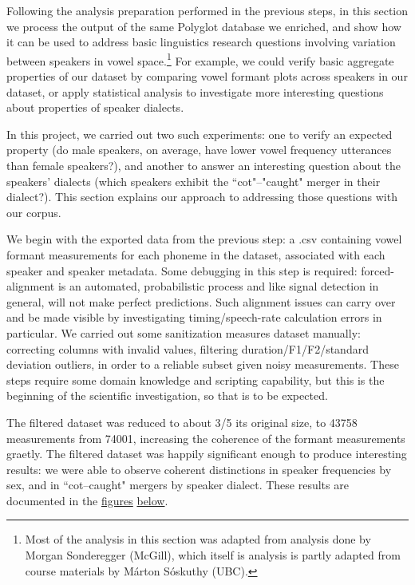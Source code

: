 \documentclass[11pt]{article}
\begin{document}
Following the analysis preparation performed in the previous steps, in this section we process the output of the same Polyglot database we enriched, and show how it can be used to address basic linguistics research questions involving variation between speakers in vowel space.\footnote{Most of the analysis in this section was adapted from analysis done by Morgan Sonderegger (McGill), which itself is analysis is partly adapted from course materials by Márton Sóskuthy (UBC).} For example, we could verify basic aggregate properties of our dataset by comparing vowel formant plots across speakers in our dataset, or apply statistical analysis to investigate more interesting questions about properties of speaker dialects.

In this project, we carried out two such experiments: one to verify an expected property (do male speakers, on average, have lower vowel frequency utterances than female speakers?), and another to answer an interesting question about the speakers' dialects (which speakers exhibit the ``cot"--"caught" merger in their dialect?). This section explains our approach to addressing those questions with our corpus.

We begin with the exported data from the previous step: a .csv containing vowel formant measurements for each phoneme in the dataset, associated with each speaker and speaker metadata. Some debugging in this step is required: forced-alignment is an automated, probabilistic process and like signal detection in general, will not make perfect predictions. Such alignment issues can carry over and be made visible by investigating timing/speech-rate calculation errors in particular. We carried out some sanitization measures dataset manually: correcting columns with invalid values, filtering duration/F1/F2/standard deviation outliers, in order to a reliable subset given noisy measurements. These steps require some domain knowledge and scripting capability, but this is the beginning of the scientific investigation, so that is to be expected.

The filtered dataset was reduced to about 3/5 its original size, to 43758 measurements from 74001, increasing the coherence of the formant measurements graetly. The filtered dataset was happily significant enough to produce interesting results: we were able to observe coherent distinctions in speaker frequencies by sex, and in ``cot--caught" mergers by speaker dialect. These results are documented in the \hyperlink{fig:sex_formant}{figures} \hyperlink{fig:dialect-analysis}{below}.
\end{document}
